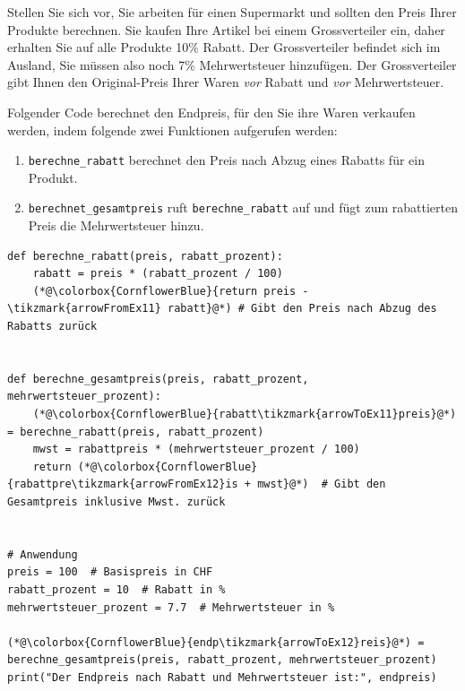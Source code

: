 \begin{myexample}
Stellen Sie sich vor, Sie arbeiten für einen Supermarkt und sollten den Preis Ihrer Produkte berechnen. Sie kaufen Ihre Artikel bei einem Grossverteiler ein, daher erhalten Sie auf alle Produkte 10\% Rabatt. Der Grossverteiler befindet sich im Ausland, Sie müssen also noch 7\% Mehrwertsteuer hinzufügen. Der Grossverteiler gibt Ihnen den Original-Preis Ihrer Waren \textit{vor} Rabatt und \textit{vor} Mehrwertsteuer.

Folgender Code berechnet den Endpreis, für den Sie ihre Waren verkaufen werden, indem folgende zwei Funktionen aufgerufen werden:
\begin{enumerate}
\item \lstinline|berechne_rabatt| berechnet den Preis nach Abzug eines Rabatts für ein Produkt.
\item \lstinline|berechnet_gesamtpreis| ruft \lstinline|berechne_rabatt| auf und fügt zum rabattierten Preis die Mehrwertsteuer hinzu.
\end{enumerate}

\begin{minipage}{\linewidth}
\begin{lstlisting}
def berechne_rabatt(preis, rabatt_prozent):
    rabatt = preis * (rabatt_prozent / 100)
    (*@\colorbox{CornflowerBlue}{return preis - \tikzmark{arrowFromEx11} rabatt}@*) # Gibt den Preis nach Abzug des Rabatts zurück


def berechne_gesamtpreis(preis, rabatt_prozent, mehrwertsteuer_prozent):
    (*@\colorbox{CornflowerBlue}{rabatt\tikzmark{arrowToEx11}preis}@*) = berechne_rabatt(preis, rabatt_prozent)
    mwst = rabattpreis * (mehrwertsteuer_prozent / 100)
    return (*@\colorbox{CornflowerBlue}{rabattpre\tikzmark{arrowFromEx12}is + mwst}@*)  # Gibt den Gesamtpreis inklusive Mwst. zurück


# Anwendung
preis = 100  # Basispreis in CHF
rabatt_prozent = 10  # Rabatt in %
mehrwertsteuer_prozent = 7.7  # Mehrwertsteuer in %

(*@\colorbox{CornflowerBlue}{endp\tikzmark{arrowToEx12}reis}@*) = berechne_gesamtpreis(preis, rabatt_prozent, mehrwertsteuer_prozent)
print("Der Endpreis nach Rabatt und Mehrwertsteuer ist:", endpreis)
\end{lstlisting}
\end{minipage}
\end{myexample}



